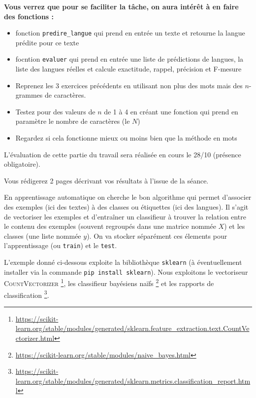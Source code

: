 \textbf{Vous verrez que pour se faciliter la tâche, on aura intérêt à en faire des fonctions :}

\begin{itemize}
  \item fonction \texttt{predire\_langue} qui prend en entrée un texte et retourne la langue prédite pour ce texte
  \item focntion \texttt{evaluer} qui prend en entrée une liste de prédictions de langues, la liste des langues réelles et calcule exactitude, rappel, précision et F-mesure 
\end{itemize}

\vspace{0.5cm}
\vspace{0.5cm}

\begin{itemize}
  \item Reprenez les 3 exercices précédents en utilisant non plus des mots mais des $n$-grammes de caractères.
  \item Testez pour des valeurs de $n$ de 1 à 4 en créant une fonction qui prend en paramètre le nombre de caractères (le $N$)
  \item Regardez si cela fonctionne mieux ou moins bien que la méthode en mots
\end{itemize}

L'évaluation de cette partie du travail sera réalisée en cours le 28/10 (présence obligatoire).

Vous rédigerez 2 pages décrivant vos résultats à l'issue de la séance.


\vspace{0.5cm}
\vspace{0.5cm}


 En apprentissage automatique on cherche le bon algorithme qui permet d'associer des exemples (ici des textes) à des classes ou étiquettes (ici des langues).
Il s'agit de vectoriser les exemples et d'entraîner un classifieur à trouver la relation entre le contenu des exemples (souvent regroupés dans une matrice nommée $X$) et les classes (une liste nommée $y$). On va stocker séparément ces élements pour l'apprentissage (ou \texttt{train}) et le \texttt{test}.

 L'exemple donné ci-dessous exploite la bibliothèque \texttt{sklearn} (à éventuellement installer via la commande \texttt{pip install sklearn}). Nous exploitons le vectoriseur \textsc{CountVectorizer}
 \footnote{\url{https://scikit-learn.org/stable/modules/generated/sklearn.feature_extraction.text.CountVectorizer.html}}, les classifieur bayésiens naïfs 
 \footnote{\url{https://scikit-learn.org/stable/modules/naive_bayes.html}}
 et les rapports de classification
 \footnote{\url{https://scikit-learn.org/stable/modules/generated/sklearn.metrics.classification_report.html}}.

